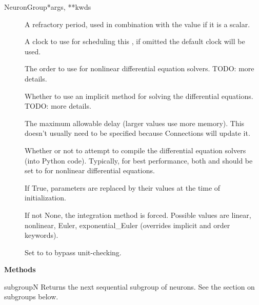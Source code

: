 \documentclass[letterpaper,10pt,english]{manual}
\begin{document}
\begin{classdesc}{NeuronGroup}{*args, **kwds}
\begin{description}
\item[] \leavevmode
A refractory period, used in combination with the  value
if it is a scalar.

\item[] \leavevmode
A clock to use for scheduling this \hyperlink{brian.NeuronGroup}{}, if omitted the
default clock will be used.

\item[] \leavevmode
The order to use for nonlinear differential equation solvers.
TODO: more details.

\item[] \leavevmode
Whether to use an implicit method for solving the differential
equations. TODO: more details.

\item[] \leavevmode
The maximum allowable delay (larger values use more memory).
This doesn't usually need to be specified because Connections will update it.

\item[] \leavevmode
Whether or not to attempt to compile the differential equation
solvers (into Python code). Typically, for best performance, both 
and  should be set to  for nonlinear differential equations.

\item[] \leavevmode
If True, parameters are replaced by their values at the time
of initialization.

\item[] \leavevmode
If not None, the integration method is forced. Possible values are
linear, nonlinear, Euler, exponential\_Euler (overrides implicit and order
keywords).

\item[] \leavevmode
Set to  to bypass unit-checking.

\end{description}

\textbf{Methods}

\hypertarget{brian.NeuronGroup.subgroup}{}\begin{methoddesc}{subgroup}{N}
Returns the next sequential subgroup of  neurons. See
the section on subgroups below.
\end{methoddesc}


\end{classdesc}
\end{document}

